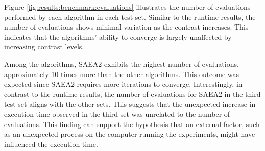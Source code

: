 			
			Figure \ref{fig:results:benchmark:evaluations} illustrates the number of evaluations performed by each algorithm in each test set. Similar to the runtime results, the number of evaluations shows minimal variation as the contrast increases. This indicates that the algorithms' ability to converge is largely unaffected by increasing contrast levels.
			
			Among the algorithms, SAEA2 exhibits the highest number of evaluations, approximately 10 times more than the other algorithms. This outcome was expected since SAEA2 requires more iterations to converge. Interestingly, in contrast to the runtime results, the number of evaluations for SAEA2 in the third test set aligns with the other sets. This suggests that the unexpected increase in execution time observed in the third set was unrelated to the number of evaluations. This finding can support the hypothesis that an external factor, such as an unexpected process on the computer running the experiments, might have influenced the execution time.
			
